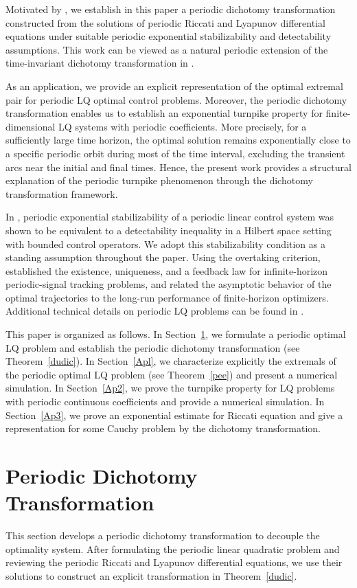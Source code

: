 \documentclass{IEEEtran}
\begin{document}
	Motivated by \cite[Lemma 1]{TZZ}, we establish in this paper a periodic dichotomy transformation constructed from the solutions of periodic Riccati and Lyapunov differential equations under suitable periodic exponential stabilizability and detectability assumptions.
	This work can be viewed as a natural periodic extension of the time-invariant dichotomy transformation in \cite[Lemma 1]{TZZ}.
	
	As an application, we provide an explicit representation of the optimal extremal pair for periodic LQ optimal control problems.
	Moreover, the periodic dichotomy transformation enables us to establish an exponential turnpike property for finite-dimensional LQ systems with periodic coefficients.
	More precisely, for a sufficiently large time horizon, the optimal solution remains exponentially close to a specific periodic orbit during most of the time interval, excluding the transient arcs near the initial and final times.
	Hence, the present work provides a structural explanation of the periodic turnpike phenomenon through the dichotomy transformation framework.
	
	In \cite{Xu21}, periodic exponential stabilizability of a periodic linear control system was shown to be equivalent to a detectability inequality in a Hilbert space setting with bounded control operators. We adopt this stabilizability condition as a standing assumption throughout the paper.
	Using the overtaking criterion, \cite{AL85} established the existence, uniqueness, and a feedback law for infinite-horizon periodic-signal tracking problems, and related the asymptotic behavior of the optimal trajectories to the long-run performance of finite-horizon optimizers.
	Additional technical details on periodic LQ problems can be found in \cite{WX17}.
	
	This paper is organized as follows. 
	In Section~\ref{pd}, we formulate a periodic optimal LQ problem and establish the periodic dichotomy transformation (see Theorem~\ref{dudic}). 
	In Section~\ref{Apl}, we characterize explicitly the extremals of the periodic optimal LQ problem (see Theorem~\ref{pee}) and present a numerical simulation.
	In Section~\ref{Ap2}, we prove the turnpike property for LQ problems with periodic continuous coefficients and provide a numerical simulation.
	In Section~\ref{Ap3}, we prove an exponential estimate for Riccati equation and give a representation for some Cauchy problem by the dichotomy transformation.
	
	
	\section{Periodic Dichotomy Transformation}\label{pd}
	This section develops a periodic dichotomy transformation to decouple the optimality system. 
	After formulating the periodic linear quadratic problem and reviewing the periodic Riccati and Lyapunov differential equations, we use their solutions to construct an explicit transformation in Theorem~\ref{dudic}. 
	
\end{document}
